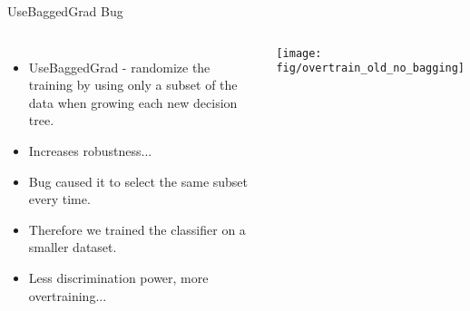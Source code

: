 \documentclass[t, 8pt]{beamer}
\begin{document}
\begin{frame}{UseBaggedGrad Bug}
  \begin{columns}[c]
  \begin{itemize}
    \item UseBaggedGrad - randomize the training by using only a subset of the
    data when growing each new decision tree.
    \item Increases robustness...
    \item Bug caused it to select the same subset every time. 
    \item Therefore we trained the classifier on a smaller dataset.
    \item Less discrimination power, more overtraining...
  \end{itemize}
    \texttt{[image: fig/overtrain\_old\_no\_bagging]}
  \end{columns}
\end{frame}

\end{document}
